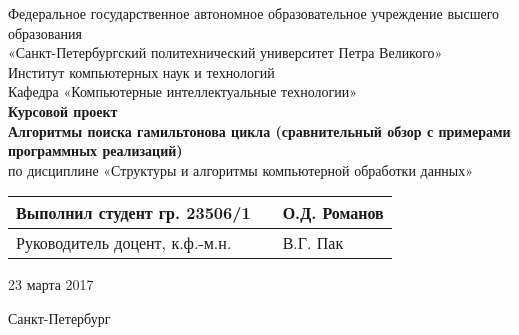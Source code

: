 \begin{titlepage}

	\begin{center}

		\large Федеральное государственное автономное образовательное учреждение высшего образования \\
		\large «Санкт-Петербургский политехнический университет Петра Великого» \\
		\large Институт компьютерных наук и технологий \\
		\large Кафедра «Компьютерные интеллектуальные технологии» \\[4cm]

		\huge {\bf Курсовой проект} \\[0.5cm]
		\large {\bf Алгоритмы поиска гамильтонова цикла (сравнительный обзор с примерами программных реализаций)} \\[0.1cm]
		\large по дисциплине «Структуры и алгоритмы компьютерной обработки данных» \\[4cm]

	\end{center}

    \begin{tabular}{|p{4cm}|p{2cm}|p{4cm}|} \hline
        Выполнил студент гр. 23506/1 & & О.Д. Романов \\ \hline
        Руководитель доцент, к.ф.-м.н. & &  В.Г. Пак \\ \hline
    \end{tabular}

    \begin{flushright}
        23 марта 2017
    \end{flushright}

	
	\vfill

	\begin{center}
	    \large Санкт-Петербург\\
	    \large \the\year
	\end{center}

\thispagestyle{empty}
\end{titlepage}